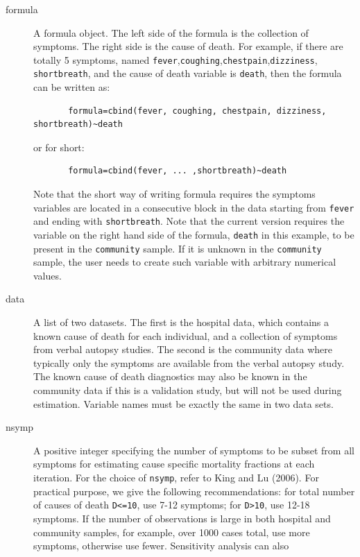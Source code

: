 \documentclass[oneside,letterpaper,titlepage]{article}
\begin{document}
\begin{description}
\item[formula] A formula object. The left side of the formula is the
  collection of symptoms. The right side is the cause of death.  For
  example, if there are totally 5 symptoms, named
  \texttt{fever},\texttt{coughing},\texttt{chestpain},\texttt{dizziness},
  \texttt{shortbreath}, and the cause of death variable is
  \texttt{death}, then the formula can be written as:

    \begin{verbatim}
       formula=cbind(fever, coughing, chestpain, dizziness, shortbreath)~death
    \end{verbatim}
  or for short:
    \begin{verbatim}
       formula=cbind(fever, ... ,shortbreath)~death
       \end{verbatim}
  Note that the short way of writing formula requires the symptoms
  variables are located in a consecutive block in the data starting
  from \texttt{fever} and ending with \texttt{shortbreath}.
Note that the current version requires the variable on the right hand
   side of the formula, \texttt{death} in this example, to be present in
   the \texttt{community} sample. If it is unknown in the
   \texttt{community} sample, the user needs to create such variable
   with arbitrary numerical values.
\item[data] A list of two datasets. The first is the hospital data,
  which contains a known cause of death for each individual, and a
  collection of symptoms from verbal autopsy studies.  The second is
  the community data where typically only the symptoms are available
  from the verbal autopsy study. The known cause of death diagnostics
  may also be known in the community data if this is a validation
  study, but will not be used during estimation.  Variable names must
  be exactly the same in two data sets.
\item[nsymp] A positive integer specifying the number of symptoms to
  be subset from all symptoms for estimating cause specific mortality
  fractions at each iteration. For the choice of \texttt{nsymp}, refer   
  to King and Lu (2006). For practical purpose, we give the following 
  recommendations: for total number of causes of death \texttt{D<=10}, 
  use 7-12 symptoms; for \texttt{D>10}, use 12-18 symptoms. If the 
  number of observations is large in both hospital and community samples,
  for example, over 1000 cases total, use more symptoms, 
  otherwise use fewer. Sensitivity analysis can also 

\end{description}
\end{document}

